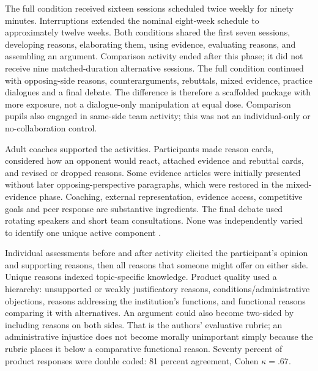 The full condition received sixteen sessions scheduled twice weekly for
ninety minutes. Interruptions extended the nominal eight-week schedule to
approximately twelve weeks. Both conditions shared the first seven sessions,
developing reasons, elaborating them, using evidence, evaluating reasons,
and assembling an argument. Comparison activity ended after this phase;
it did not receive nine matched-duration alternative sessions. The full
condition continued with opposing-side reasons, counterarguments, rebuttals,
mixed evidence, practice dialogues and a final debate. The difference is
therefore a scaffolded package with more exposure, not a dialogue-only
manipulation at equal dose.
Comparison pupils also engaged in same-side team activity; this was not
an individual-only or no-collaboration control.

Adult coaches supported the activities. Participants made reason cards,
considered how an opponent would react, attached evidence and rebuttal cards,
and revised or dropped reasons. Some evidence articles were initially
presented without later opposing-perspective paragraphs, which were restored
in the mixed-evidence phase. Coaching, external representation, evidence
access, competitive goals and peer response are substantive ingredients.
The final debate used rotating speakers and short team consultations.
None was independently varied to identify one unique active component
\cite[pp.~1250--1251]{KuhnUdell2003Development}.

Individual assessments before and after activity elicited the participant's
opinion and supporting reasons, then all reasons that someone might offer
on either side. Unique reasons indexed topic-specific knowledge. Product
quality used a hierarchy: unsupported or weakly justificatory reasons,
conditions/administrative objections, reasons addressing the institution's
functions, and functional reasons comparing it with alternatives. An
argument could also become two-sided by including reasons on both sides.
That is the authors' evaluative rubric; an administrative injustice does
not become morally unimportant simply because the rubric places it below
a comparative functional reason. Seventy percent of product responses were
double coded: 81 percent agreement, Cohen \(\kappa=.67\).

